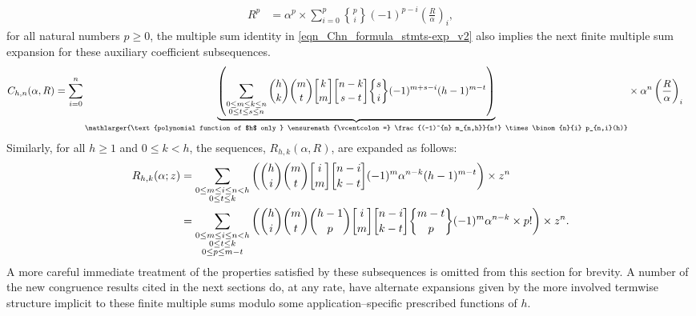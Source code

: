 \documentclass[12pt,reqno]{article}
\renewenvironment{subequations}{%
  \refstepcounter{equation}%
  \edef\theparentequation{\theequation}%
  \setcounter{parentequation}{\value{equation}}%
  \setcounter{equation}{0}%
  \def\theequation{\theparentequation.\alph{equation}}%
  \ignorespaces
}{%
  \setcounter{equation}{\value{parentequation}}%
  \ignorespacesafterend
}
\numberwithin{sfootnote}{section}
\numberwithin{equation}{section}
\theoremstyle{DefaultTheoremStyle}
\theoremstyle{definition}
\newcommand{\defequals}{\ensuremath{\vcentcolon=}}
\newcommand{\gkpSI}[2]{\ensuremath{\genfrac{\lbrack}{\rbrack}{0pt}{}{#1}{#2}}}
\newcommand{\gkpSII}[2]{\ensuremath{\genfrac{\{}{\}}{0pt}{}{#1}{#2}}}
\newcommand{\Pochhammer}[2]{\ensuremath{\left(#1\right)_{#2}}}
\begin{document}
\begin{subequations}
\citep[\S 6.1]{GKP} 
\begin{align*} 
R^{p} & = \alpha^{p} \times 
     \sum_{i=0}^{p} \gkpSII{p}{i} (-1)^{p-i} \Pochhammer{\frac{R}{\alpha}}{i}, 
\end{align*} 
for all natural numbers $p \geq 0$, the multiple sum identity in 
\eqref{eqn_Chn_formula_stmts-exp_v2} also implies the next finite multiple sum 
expansion for these auxiliary coefficient subsequences. 
\begin{align} 
\label{eqn_Chn_formula_stmts-exp_v5}
C_{h,n}(\alpha, R) & = 
     \sum_{i=0}^{n} 
     \underset{\mathlarger{\text{polynomial function of $h$ only } \defequals 
               \frac{(-1)^{n} m_{n,h}}{n!} \times \binom{n}{i} p_{n,i}(h)}}{ 
               \underbrace{ 
     \left( 
     \sum\limits_{\substack{0 \leq m \leq k \leq n \\ 
                            0 \leq t \leq s \leq n} 
                 } 
     \binom{h}{k} \binom{m}{t} \gkpSI{k}{m} \gkpSI{n-k}{s-t} \gkpSII{s}{i} 
     (-1)^{m+s-i} (h-1)^{m-t} 
     \right) 
     } 
     } 
     \times \alpha^{n} \Pochhammer{\frac{R}{\alpha}}{i} 
\end{align} 
\end{subequations} 
Similarly, for all $h \geq 1$ and $0 \leq k < h$, the sequences, 
$R_{h,k}(\alpha, R)$, are expanded as follows: 
\begin{align} 
\label{eqn_Rhk_formula_stmts} 
R_{h,k}(\alpha; z) & = 
     \sum\limits_{\substack{0 \leq m \leq i \leq n < h \\ 
                            0 \leq t \leq k} 
                 } 
     \left( 
     \binom{h}{i} \binom{m}{t} \gkpSI{i}{m} \gkpSI{n-i}{k-t} 
     (-1)^{m} \alpha^{n-k} (h-1)^{m-t} 
     \right) \times z^{n} \\ 
\notag 
   & = 
     \sum\limits_{\substack{0 \leq m \leq i \leq n < h \\ 
                            0 \leq t \leq k \\ 0 \leq p \leq m-t} 
                 } 
     \left( 
     \binom{h}{i} \binom{m}{t} \binom{h-1}{p} 
     \gkpSI{i}{m} \gkpSI{n-i}{k-t} \gkpSII{m-t}{p} 
     (-1)^{m} \alpha^{n-k} \times p! 
     \right) \times z^{n}. 
\end{align} 
A more careful immediate 
treatment of the properties satisfied by these subsequences is omitted 
from this section for brevity. 
A number of the new congruence results cited in the next sections do, 
at any rate, 
have alternate expansions given by the more involved termwise structure 
implicit to these finite multiple sums modulo some 
application--specific prescribed functions of $h$. 
\end{document}
